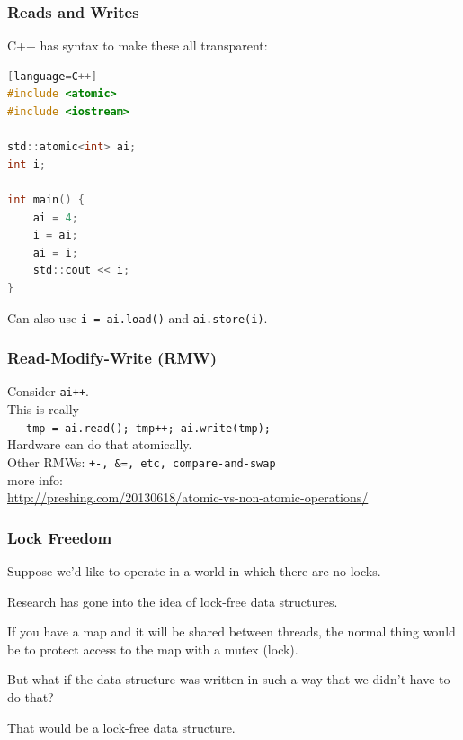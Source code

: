 \begin{frame}[fragile]
  \frametitle{Reads and Writes}

  
    C++ has syntax to make these all transparent:
\begin{lstlisting}[language=C][language=C++]
#include <atomic>
#include <iostream>

std::atomic<int> ai;
int i;

int main() {
    ai = 4;
    i = ai;
    ai = i;
    std::cout << i;
}
\end{lstlisting}
Can also use {\tt i = ai.load()} and {\tt ai.store(i)}.
  
\end{frame}

\begin{frame}
  \frametitle{Read-Modify-Write (RMW)}

  
    Consider {\tt ai++}.\\[1em]
    This is really \\
    ~~~{\tt tmp = ai.read(); tmp++; ai.write(tmp); }\\[1em]
    Hardware can do that atomically.\\[1em]
    Other RMWs: {\tt +-, \&=, etc, compare-and-swap}\\[2em]

    {\small
      more info:\\ \url{http://preshing.com/20130618/atomic-vs-non-atomic-operations/}
      }
  
\end{frame}





\begin{frame}
\frametitle{Lock Freedom}

Suppose we'd like to operate in a world in which there are no locks. 

Research has gone into the idea of lock-free data structures. 

If you have a map and it will be shared between threads, the normal thing would be to protect access to the map with a mutex (lock). 

But what if the data structure was written in such a way that we didn't have to do that? 

That would be a lock-free data structure.

\end{frame}

